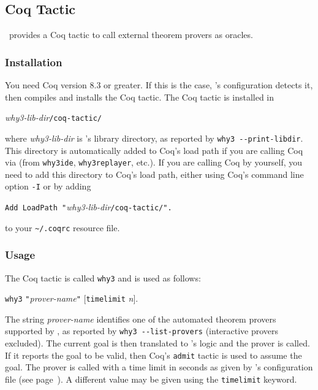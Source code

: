 \subsection{Coq Tactic}
\label{sec:coqtactic}

\why\ provides a Coq tactic to call external theorem provers as oracles.

\subsubsection{Installation}

You need Coq version 8.3 or greater. If this is the case, \why's
configuration detects it, then compiles and installs the Coq tactic.
The Coq tactic is installed in
\begin{center}
  \textit{why3-lib-dir}\texttt{/coq-tactic/}
\end{center}
where \textit{why3-lib-dir} is \why's library directory, as reported
by \verb+why3 --print-libdir+. This directory
is automatically added to Coq's load path if you are
calling Coq via \why (from \texttt{why3ide}, \texttt{why3replayer},
etc.). If you are calling Coq by yourself, you need to add
this directory to Coq's load path, either using Coq's command line
option \texttt{-I} or by adding
\begin{center}
  \verb+Add LoadPath "+\textit{why3-lib-dir}\verb+/coq-tactic/".+
\end{center}
to your \texttt{\~{}/.coqrc} resource file.

\subsubsection{Usage}

The Coq tactic is called \texttt{why3} and is used as follows:
\begin{center}
  \texttt{why3} \verb+"+\textit{prover-name}\verb+"+
  $[$\texttt{timelimit} \textit{n}$]$.
\end{center}
The string \textit{prover-name} identifies one of the automated theorem provers
supported by \why, as reported by \verb+why3 --list-provers+
(interactive provers excluded).
The current goal is then translated to \why's logic and the prover is
called. If it reports the goal to be valid, then Coq's \texttt{admit}
tactic is used to assume the goal. The prover is called with a time
limit in seconds as given by \why's configuration file
(see page~\pageref{sec:whyconffile}). A different value may be given
using the \texttt{timelimit} keyword.

